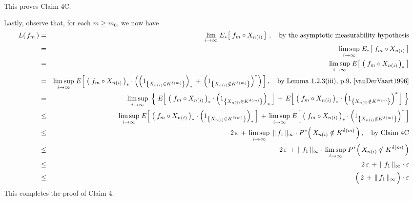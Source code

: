 This proves Claim 4C.

\vskip 0.5cm
\noindent
Lastly, observe that, for each $m \geq m_{0}$, we now have
\begin{eqnarray*}
L(\,f_{m}\,)
&=&
	\underset{i\rightarrow\infty}{\lim}\; E_{*}\!\left[\; f_{m} \circ X_{n(i)} \,\right]\,,
	\quad
	\textnormal{by the asymptotic measurability hypothesis}
\\
&=&
	\underset{i\rightarrow\infty}{\limsup}\; E_{*}\!\left[\; f_{m} \circ X_{n(i)} \,\right]
\\
&=&
	\underset{i\rightarrow\infty}{\limsup}\; E\!\left[\; \left(\;f_{m} \circ X_{n(i)}\,\right)_{*} \,\right]
\\
&=&
	\underset{i\rightarrow\infty}{\limsup}\;
	E\!\left[\;
		\left(\;f_{m} \circ X_{n(i)}\,\right)_{*}
		\cdot
		\left(
			\left(1_{\left\{X_{n(i)} \in K^{\delta(m)}\right\}}\right)_{*}
			\,+\,
			\left(1_{\left\{X_{n(i)} \notin K^{\delta(m)}\right\}}\right)^{*}
		\right)
	\,\right],
	\quad\textnormal{by Lemma 1.2.3(iii), p.9, \cite{vanDerVaart1996}}
\\
&=&
	\underset{i\rightarrow\infty}{\limsup}\;
	\left\{\;
		E\!\left[\;
			\left(\;f_{m} \circ X_{n(i)}\,\right)_{*}
			\cdot
			\left(1_{\left\{X_{n(i)} \in K^{\delta(m)}\right\}}\right)_{*}
		\,\right]
		\, + \,
		E\!\left[\;
			\left(\;f_{m} \circ X_{n(i)}\,\right)_{*}
			\cdot
			\left(1_{\left\{X_{n(i)} \notin K^{\delta(m)}\right\}}\right)^{*}
		\,\right]
	\;\right\}
\\
&\leq&
	\underset{i\rightarrow\infty}{\limsup}\;
	E\!\left[\;
		\left(\;f_{m} \circ X_{n(i)}\,\right)_{*}
		\cdot
		\left(1_{\left\{X_{n(i)} \in K^{\delta(m)}\right\}}\right)_{*}
	\,\right]
	\, + \,
	\underset{i\rightarrow\infty}{\limsup}\;
	E\!\left[\;
		\left(\;f_{m} \circ X_{n(i)}\,\right)_{*}
		\cdot
		\left(1_{\left\{X_{n(i)} \notin K^{\delta(m)}\right\}}\right)^{*}
	\,\right]
\\
&\leq&
	2\,\varepsilon
	\, + \,
	\underset{i\rightarrow\infty}{\limsup}\;\,
	\Vert\,f_{1}\,\Vert_{\infty} \cdot P^{*}\!\left(\,X_{n(i)} \notin K^{\delta(m)}\,\right),
	\quad
	\textnormal{by Claim 4C}
\\
&\leq&
	2\,\varepsilon
	\, + \,
	\Vert\,f_{1}\,\Vert_{\infty} \cdot \,
	\underset{i\rightarrow\infty}{\limsup}\;
	P^{*}\!\left(\,X_{n(i)} \notin K^{\delta(m)}\,\right)
\\
&\leq&
	2\,\varepsilon \, + \, \Vert\,f_{1}\,\Vert_{\infty} \cdot \varepsilon
\\
&\leq&
	\left(\,2 \, \overset{{\color{white}.}}{+} \, \Vert\,f_{1}\,\Vert_{\infty} \,\right) \cdot \varepsilon
\end{eqnarray*}
This completes the proof of Claim 4.

